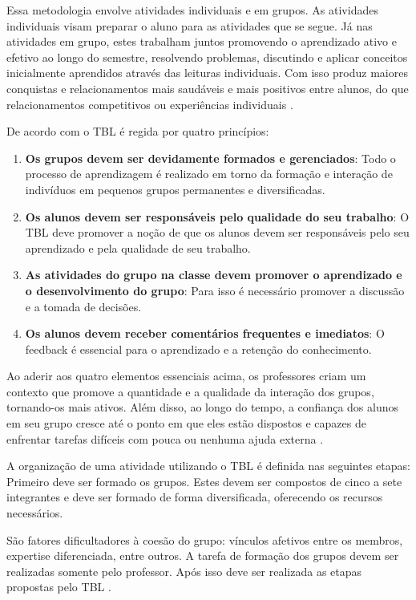 Essa metodologia envolve atividades individuais e em grupos. As atividades individuais visam preparar o aluno para as atividades que se segue. Já nas atividades em grupo, estes trabalham juntos promovendo o aprendizado ativo e efetivo ao longo do semestre, resolvendo problemas, discutindo e aplicar conceitos inicialmente aprendidos através das leituras individuais. Com isso  produz maiores conquistas e relacionamentos mais saudáveis e mais positivos entre alunos, do que relacionamentos competitivos ou experiências individuais \cite{gomez}.

De acordo com \cite{sweet} o TBL é regida por quatro princípios:

\begin{enumerate}
  \item \textbf{Os grupos devem ser devidamente formados e gerenciados}: Todo o processo de aprendizagem é realizado em torno da formação e interação de indivíduos em pequenos grupos permanentes e diversificadas.
  \item \textbf{Os alunos devem ser responsáveis pelo qualidade do seu trabalho}: O TBL deve promover a noção de que os alunos devem ser responsáveis pelo seu aprendizado e pela qualidade de seu trabalho.
  \item \textbf{As atividades do grupo na classe devem promover o aprendizado e o desenvolvimento do grupo}: Para isso é necessário promover a discussão e a tomada de decisões.
  \item \textbf{Os alunos devem receber comentários frequentes e imediatos}: O feedback é essencial para o aprendizado e a retenção do conhecimento.
\end{enumerate}

Ao aderir aos quatro elementos essenciais acima, os professores criam um contexto que promove a quantidade e a qualidade da interação dos grupos, tornando-os mais ativos. Além disso, ao longo do tempo, a confiança dos alunos em seu grupo cresce até o ponto em que eles estão dispostos e capazes de enfrentar tarefas difíceis com pouca ou nenhuma ajuda externa \cite{sweet}.

A organização de uma atividade utilizando o TBL é definida nas seguintes etapas: Primeiro deve ser formado os grupos.  Estes devem ser compostos de cinco a sete integrantes e deve ser formado de forma diversificada, oferecendo os recursos necessários.

São fatores dificultadores à coesão do grupo: vínculos afetivos entre os membros, expertise diferenciada, entre outros.  A tarefa de formação dos grupos devem ser realizadas somente pelo professor. Após isso deve ser realizada as etapas propostas pelo TBL \cite{bollela}.


